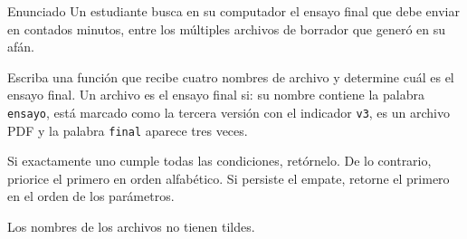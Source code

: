 \documentclass{ip-quiz}
\begin{document}
\makeheader
\maketitle

\begin{sectionbox}{Enunciado}
Un estudiante busca en su computador el ensayo final que debe enviar en contados minutos, entre los múltiples archivos de borrador que generó en su afán.

Escriba una función que recibe cuatro nombres de archivo y determine cuál es el ensayo final. Un archivo es el ensayo final si: su nombre contiene la palabra \texttt{ensayo}, está marcado como la tercera versión con el indicador \texttt{v3}, es un archivo PDF y la palabra \texttt{final} aparece tres veces.

Si exactamente uno cumple todas las condiciones, retórnelo. De lo contrario, priorice el primero en orden alfabético. Si persiste el empate, retorne el primero en el orden de los parámetros.

Los nombres de los archivos no tienen tildes.
\end{sectionbox}

\pagebreak
\end{document}

